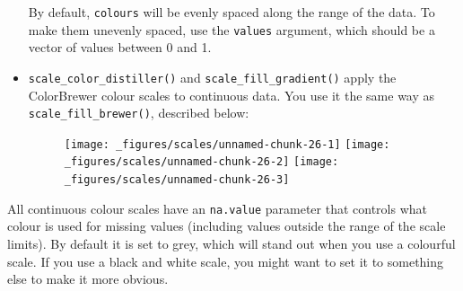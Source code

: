 \begin{itemize}
  By default, \texttt{colours} will be evenly spaced along the range of
  the data. To make them unevenly spaced, use the \texttt{values}
  argument, which should be a vector of values between 0 and 1.
\item
  \texttt{scale\_color\_distiller()} and
  \texttt{scale\_fill\_gradient()} apply the ColorBrewer colour scales
  to continuous data. You use it the same way as
  \texttt{scale\_fill\_brewer()}, described below:

\begin{Shaded}
\begin{Highlighting}[]
\StringTok{ }\NormalTok{()}
\StringTok{ }\NormalTok{(} \NormalTok{)}
\StringTok{ }\NormalTok{(} \NormalTok{)}
\end{Highlighting}
\end{Shaded}

  \begin{figure}[H]
    \texttt{[image: \_figures/scales/unnamed-chunk-26-1]}%
    \texttt{[image: \_figures/scales/unnamed-chunk-26-2]}%
    \texttt{[image: \_figures/scales/unnamed-chunk-26-3]}
  \end{figure}
\end{itemize}

All continuous colour scales have an \texttt{na.value} parameter that
controls what colour is used for missing values (including values
outside the range of the scale limits). By default it is set to grey,
which will stand out when you use a colourful scale. If you use a black
and white scale, you might want to set it to something else to make it
more obvious.  

\begin{Shaded}
\begin{Highlighting}[]
\StringTok{ }\NormalTok{(} \NormalTok{, } \NormalTok{:}\NormalTok{, } \NormalTok{(}\NormalTok{, }\NormalTok{, }\NormalTok{, }\NormalTok{, }\NormalTok{))}
\StringTok{ }\StringTok{ }\NormalTok{(}\NormalTok{(}  \NormalTok{)}
\StringTok{ }\NormalTok{(} \NormalTok{)}
\StringTok{ }\NormalTok{(} \NormalTok{, } \NormalTok{, } \NormalTok{)}
\end{Highlighting}
\end{Shaded}


